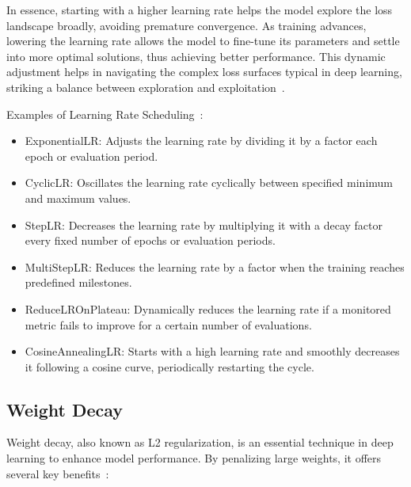 \documentclass[12pt,a4paper]{report}
\begin{document}
In essence, starting with a higher learning rate helps the model explore the loss landscape broadly, avoiding premature convergence. As training advances, lowering the learning rate allows the model to fine-tune its parameters and settle into more optimal solutions, thus achieving better performance. This dynamic adjustment helps in navigating the complex loss surfaces typical in deep learning, striking a balance between exploration and exploitation~\cite{learningrate}.

Examples of Learning Rate Scheduling~\cite{learningrate2}:

\begin{itemize}
  \item ExponentialLR: Adjusts the learning rate by dividing it by a factor each epoch or evaluation period.
  \item CyclicLR: Oscillates the learning rate cyclically between specified minimum and maximum values.
  \item StepLR: Decreases the learning rate by multiplying it with a decay factor every fixed number of epochs or evaluation periods.
  \item MultiStepLR: Reduces the learning rate by a factor when the training reaches predefined milestones.
  \item ReduceLROnPlateau: Dynamically reduces the learning rate if a monitored metric fails to improve for a certain number of evaluations.
  \item CosineAnnealingLR: Starts with a high learning rate and smoothly decreases it following a cosine curve, periodically restarting the cycle.
\end{itemize}

\subsection{Weight Decay}
Weight decay, also known as L2 regularization, is an essential technique in deep learning to enhance model performance. By penalizing large weights, it offers several key benefits~\cite{weightdecay}:
\end{document}
